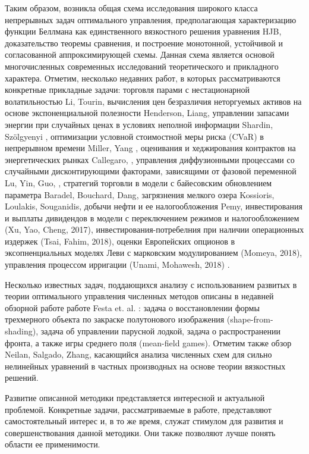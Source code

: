 Таким образом, возникла общая схема исследования широкого класса непрерывных  задач оптимального управления, предполагающая характеризацию функции Беллмана как единственного вязкостного решения уравнения HJB, доказательство теоремы сравнения, и построение монотонной, устойчивой и согласованной аппроксимирующей схемы. Данная схема является основой многочисленных современных исследований теоретического и прикладного характера. Отметим, несколько недавних работ, в которых рассматриваются конкретные прикладные задачи: торговля парами с нестационарной волатильностью Li, Tourin\cite{LiTour16}, вычисления цен безразличия неторгуемых активов на основе экспоненциальной полезности Henderson, Liang\cite{HenLian2016}, управлении запасами энергии при случайных ценах в условиях неполной информации Shardin, Sz{\"o}lgyenyi \cite{ShaSzo16}, оптимизации условной стоимостной меры риска (CVaR) в непрерывном времени Miller, Yang \cite{MilYan17}, оценивания и хеджирования контрактов на  энергетических рынках Callegaro\cite{Callegaro2017}, , управления диффузионными процессами со случайными дисконтирующими факторами, зависящими от фазовой переменной Lu, Yin, Guo, \cite{LuYinGuo17}, стратегий торговли в модели с байесовским обновлением параметра Baradel, Bouchard, Dang\cite{BarBouDan16}, загрязнения мелкого озера Kossioris, Loulakis, Souganidis\cite{KosLouSouPan17}, добычи нефти и ее налогообложения Pemy\cite{Pemy17}, инвестирования и выплаты дивидендов в модели с переключением режимов и налогообложением (Xu, Yao, Cheng, 2017), инвестирования-потребелния при наличии операционных издержек (Tsai, Fahim, 2018), оценки Европейских опционов в эксопненциальных моделях Леви с марковским модулированием (Momeya, 2018), управления процессом ирригации (Unami, Mohawesh, 2018) . 

Несколько известных задач, поддающихся анализу с использованием развитых в теории оптимального управления численных методов описаны в недавней обзорной работе работе Festa et. al. \cite{Festa17}: задача о восстановлении формы трехмерного объекта по закраске полутонового изображения (shape-from-shading), задача об управлении парусной лодкой, задача о распространении фронта, а также игры среднего поля (mean-field games). Отметим также обзор Neilan, Salgado, Zhang\cite{NeiSalZha17}, касающийся анализа численных схем для сильно нелинейных уравнений в частных производных на основе теории вязкостных решений. 

Развитие описанной методики представляется интересной и актуальной проблемой. Конкретные задачи, рассматриваемые в работе, представляют самостоятельный интерес и, в то же время, служат стимулом для развития и совершенствования данной методики. Они также позволяют лучше понять области ее применимости.

